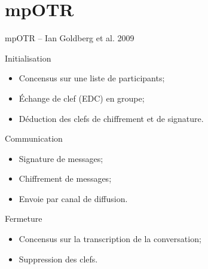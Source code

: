\documentclass{beamer}
\begin{document}


\section{mpOTR}
\begin{frame}{mpOTR -- Ian Goldberg et al. 2009~\cite{mpotr}}
	\begin{block}{Initialisation}
		\begin{itemize}
			\item Concensus sur une liste de participants;
      \item Échange de clef (EDC) en groupe;
			\item Déduction des clefs de chiffrement et de signature.
		\end{itemize}
  \end{block}

	\begin{block}{Communication}
		\begin{itemize}
			\item Signature de messages;
			\item Chiffrement de messages;
      \item Envoie par canal de diffusion.
		\end{itemize}
  \end{block}

	\begin{block}{Fermeture}
		\begin{itemize}
			\item Concensus sur la transcription de la conversation;
			\item Suppression des clefs.
		\end{itemize}
  \end{block}
\end{frame}
\end{document}
